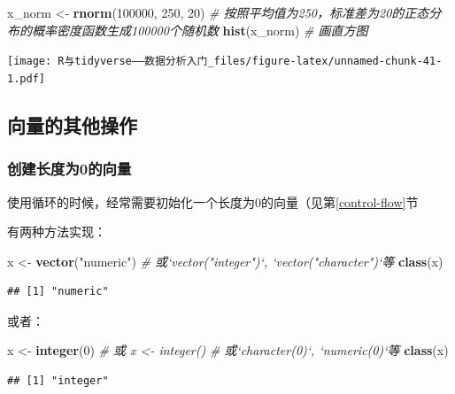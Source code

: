 \documentclass[]{book}
\newenvironment{Shaded}{\begin{snugshade}}{\end{snugshade}}
\newcommand{\CommentTok}[1]{\textcolor[rgb]{0.56,0.35,0.01}{\textit{#1}}}
\newcommand{\DecValTok}[1]{\textcolor[rgb]{0.00,0.00,0.81}{#1}}
\newcommand{\KeywordTok}[1]{\textcolor[rgb]{0.13,0.29,0.53}{\textbf{#1}}}
\newcommand{\NormalTok}[1]{#1}
\newcommand{\StringTok}[1]{\textcolor[rgb]{0.31,0.60,0.02}{#1}}
\begin{document}
\begin{Shaded}
\begin{Highlighting}[]
\NormalTok{x_norm <-}\StringTok{ }\KeywordTok{rnorm}\NormalTok{(}\DecValTok{100000}\NormalTok{, }\DecValTok{250}\NormalTok{, }\DecValTok{20}\NormalTok{) }\CommentTok{# 按照平均值为250，标准差为20的正态分布的概率密度函数生成100000个随机数}
\KeywordTok{hist}\NormalTok{(x_norm) }\CommentTok{# 画直方图}
\end{Highlighting}
\end{Shaded}

\texttt{[image: R与tidyverse——数据分析入门\_files/figure-latex/unnamed-chunk-41-1.pdf]}

\hypertarget{vector-misc}{%
\subsection{向量的其他操作}\label{vector-misc}}

\hypertarget{0}{%
\subsubsection{创建长度为0的向量}\label{0}}

使用循环的时候，经常需要初始化一个长度为0的向量（见第\ref{control-flow}节

有两种方法实现：

\begin{Shaded}
\begin{Highlighting}[]
\NormalTok{x <-}\StringTok{ }\KeywordTok{vector}\NormalTok{(}\StringTok{"numeric"}\NormalTok{)}
\CommentTok{# 或`vector("integer")`, `vector("character")`等}
\KeywordTok{class}\NormalTok{(x)}
\end{Highlighting}
\end{Shaded}

\begin{verbatim}
## [1] "numeric"
\end{verbatim}

或者：

\begin{Shaded}
\begin{Highlighting}[]
\NormalTok{x <-}\StringTok{ }\KeywordTok{integer}\NormalTok{(}\DecValTok{0}\NormalTok{)}
\CommentTok{# 或 x <- integer()}
\CommentTok{# 或`character(0)`, `numeric(0)`等}
\KeywordTok{class}\NormalTok{(x)}
\end{Highlighting}
\end{Shaded}

\begin{verbatim}
## [1] "integer"
\end{verbatim}
\end{document}
